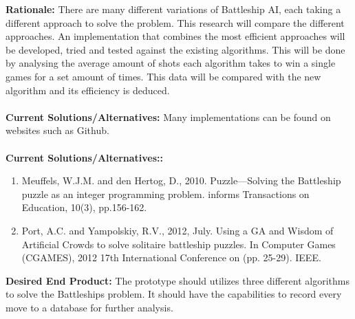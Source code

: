 \documentclass[paper=a4, fontsize=11pt]{scrartcl}
\numberwithin{equation}{section} %
\numberwithin{figure}{section} %
\numberwithin{table}{section} %
\begin{document}
\textbf{Rationale:} There are many different variations of Battleship AI, each taking a different approach to solve the problem. This research will compare the different approaches. An implementation that combines the most efficient approaches will be developed, tried and tested against the existing algorithms. This will be done by analysing the average amount of shots each algorithm takes to win a single games for a set amount of times. This data will be compared with the new algorithm and its efficiency is deduced.\\\\
\textbf{Current Solutions/Alternatives:} Many implementations can be found on websites such as Github.\\\\
\textbf{Current Solutions/Alternatives::} 
    \begin{enumerate}
        \item Meuffels, W.J.M. and den Hertog, D., 2010. Puzzle—Solving the Battleship puzzle as an integer programming problem. informs Transactions on Education, 10(3), pp.156-162.
        \item Port, A.C. and Yampolskiy, R.V., 2012, July. Using a GA and Wisdom of Artificial Crowds to solve solitaire battleship puzzles. In Computer Games (CGAMES), 2012 17th International Conference on (pp. 25-29). IEEE.
    \end{enumerate}
    
\textbf{Desired End Product:}  The prototype should utilizes three different algorithms to solve the Battleships problem. It should have the capabilities to record every move to a database for further analysis. \\\\\\\\\\\\\\\\\\
    
\end{document}

